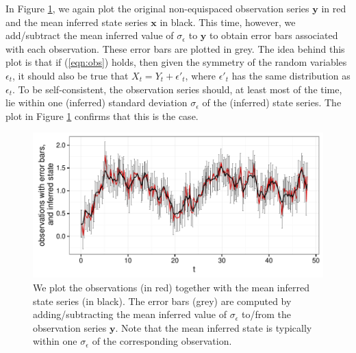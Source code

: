\documentclass[wcp]{jmlr}
\begin{document}
In Figure \ref{fig:timeseries2}, we again plot the original
non-equispaced observation series $\mathbf{y}$ in red and the mean
inferred state series $\mathbf{x}$ in black.  This time,
however, we add/subtract the mean inferred value of $\sigma_\epsilon$
to $\mathbf{y}$ to obtain error bars associated with each
observation.  These error bars are plotted in grey.  The idea behind
this plot is that if (\ref{eqn:obs}) holds, then given the symmetry of
the random variables $\epsilon_t$, it should also be true that $X_t =
Y_t + \epsilon'_t$, where $\epsilon'_t$ has the same distribution as
$\epsilon_t$.  To be self-consistent, the observation series should,
at least most of the time, lie within one (inferred) standard deviation
$\sigma_\epsilon$ of the (inferred) state series.  The plot in Figure
\ref{fig:timeseries2} confirms that this is the case.

\begin{figure}[th]
\begin{center}
\includegraphics[width=6in]{timeseries2}
\end{center}
\vspace{-0.375in}
\caption{We plot the observations (in red) together with the mean
  inferred state series (in black).  The
  error bars (grey) are computed by adding/subtracting the mean inferred
  value of $\sigma_\epsilon$ to/from the observation series
  $\mathbf{y}$.  Note that the mean inferred state is typically within
one $\sigma_\epsilon$ of the corresponding observation.}
\label{fig:timeseries2}
\end{figure}
\end{document}
